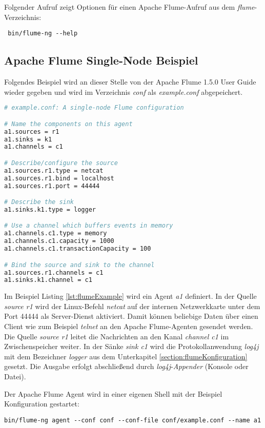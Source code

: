 Folgender Aufruf zeigt Optionen für einen Apache Flume-Aufruf aus dem \textit{flume}-Verzeichnis:
\begin{verbatim}
 bin/flume-ng --help
\end{verbatim}

\subsection{Apache Flume Single-Node Beispiel}

Folgendes Beispiel wird an dieser Stelle von der Apache Flume 1.5.0 User Guide  wieder gegeben und wird im Verzeichnis \textit{conf} als \textit{example.conf} abgepeichert.

\begin{lstlisting}[language=BASH, label=lst:flumeExample, caption=Apache Flume Beispiel]
# example.conf: A single-node Flume configuration

# Name the components on this agent
a1.sources = r1
a1.sinks = k1
a1.channels = c1

# Describe/configure the source
a1.sources.r1.type = netcat
a1.sources.r1.bind = localhost
a1.sources.r1.port = 44444

# Describe the sink
a1.sinks.k1.type = logger

# Use a channel which buffers events in memory
a1.channels.c1.type = memory
a1.channels.c1.capacity = 1000
a1.channels.c1.transactionCapacity = 100

# Bind the source and sink to the channel
a1.sources.r1.channels = c1
a1.sinks.k1.channel = c1
\end{lstlisting}

Im Beispiel Listing \ref{lst:flumeExample} wird ein Agent \textit{a1} definiert. In der Quelle \textit{source r1} wird der Linux-Befehl \textit{netcat} auf der internen Netzwerkkarte unter dem Port 44444 als Server-Dienst aktiviert. Damit können beliebige Daten über einen Client wie zum Beispiel \textit{telnet} an den Apache Flume-Agenten gesendet werden. Die Quelle \textit{source r1} leitet die Nachrichten an den Kanal \textit{channel c1} im Zwischenspeicher weiter. In der Sänke \textit{sink c1} wird die Protokollanwendung \textit{log4j} mit dem Bezeichner \textit{logger} aus dem Unterkapitel \ref{section:flumeKonfiguration} gesetzt. Die Ausgabe erfolgt abschließend durch \textit{log4j}-\textit{Appender} (Konsole oder Datei).

Der Apache Flume Agent wird in einer eigenen Shell mit der Beispiel Konfiguration gestartet:
\begin{verbatim}
bin/flume-ng agent --conf conf --conf-file conf/example.conf --name a1
\end{verbatim}

